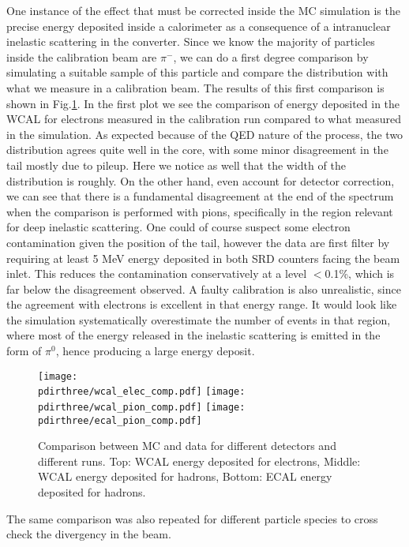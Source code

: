 One instance of the effect that must be corrected inside the MC simulation is the precise energy deposited inside a calorimeter as a consequence of a intranuclear inelastic scattering in the converter. Since we know the majority of particles inside the calibration beam are $\pi^-$, we can do a first degree comparison by simulating a suitable sample of this particle and compare the distribution with what we measure in a calibration beam. The results of this first comparison is shown in Fig.\ref{fig:ecal-comp}. In the first plot we see the comparison of energy deposited in the WCAL for electrons measured in the calibration run compared to what measured in the simulation. As expected because of the QED nature of the process, the two distribution agrees quite well in the core, with some minor disagreement in the tail mostly due to pileup. Here we notice as well that the width of the distribution is roughly. On the other hand, even account for detector correction, we can see that there is a fundamental disagreement at the end of the spectrum when the comparison is performed with pions, specifically in the region relevant for deep inelastic scattering. One could of course suspect some electron contamination given the position of the tail, however the data are first filter by requiring at least 5 MeV energy deposited in both SRD counters facing the beam inlet. This reduces the contamination conservatively at a level $<$0.1\%, which is far below the disagreement observed. A faulty calibration is also unrealistic, since the agreement with electrons is excellent in that energy range. It would look like the simulation systematically overestimate the number of events in that region, where most of the energy released in the inelastic scattering is emitted in the form of $\pi^0$, hence producing a large energy deposit.

\begin{figure}[bth!]
  \centering
  \texttt{[image: \\pdirthree/wcal\_elec\_comp.pdf]}
  \texttt{[image: \\pdirthree/wcal\_pion\_comp.pdf]}
  \texttt{[image: \\pdirthree/ecal\_pion\_comp.pdf]}
  \caption[MC/DATA Comparison of $\pi^-$ in ECAL and WCAL]{Comparison between MC and data for different detectors and different runs. Top: WCAL energy deposited for electrons, Middle: WCAL energy deposited for hadrons, Bottom: ECAL energy deposited for hadrons.}
  \label{fig:ecal-comp}
\end{figure}

The same comparison was also repeated for different particle species to cross check the divergency in the beam.

